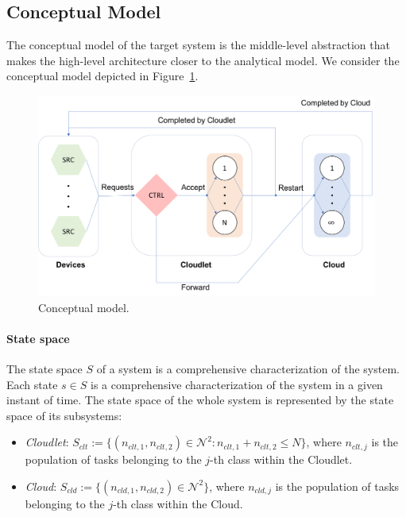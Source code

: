 \subsection{Conceptual Model}
The conceptual model of the target system is the middle-level abstraction that makes the high-level architecture closer to the analytical model. We consider the conceptual model depicted in Figure~\ref{fig:conceptual-model}.

\begin{figure}
	\includegraphics[width=\columnwidth]{fig/conceptual-model}
	\caption{Conceptual model.}
	\label{fig:conceptual-model}
\end{figure}

\paragraph{State space}
The state space $S$ of a system is a comprehensive characterization of the system. Each state $s \in S$ is a comprehensive characterization of the system in a given instant of time.
The state space of the whole system is represented by the state space of its subsystems:

\begin{itemize}
	\item \textit{Cloudlet}: $S_{clt} := \{(n_{clt,1},n_{clt,2})\in \mathcal{N}^{2}: n_{clt,1}+n_{clt,2}\leq N\}$, where $n_{clt,j}$ is the population of tasks belonging to the $j$-th class within the Cloudlet.
	
	\item \textit{Cloud}: $S_{cld} := \{(n_{cld,1},n_{cld,2})\in \mathcal{N}^{2}\}$, where $n_{cld,j}$ is the population of tasks belonging to the $j$-th class within the Cloud.
\end{itemize}

